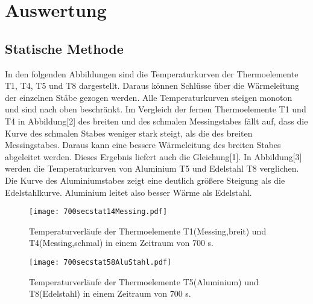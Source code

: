 \section{Auswertung}
\label{sec:Auswertung}
\subsection{Statische Methode}
In den folgenden Abbildungen sind die Temperaturkurven der Thermoelemente T1, T4, T5 und T8 dargestellt.
Daraus können Schlüsse über die Wärmeleitung der einzelnen Stäbe gezogen werden.
Alle Temperaturkurven steigen monoton und sind nach oben beschränkt.
Im Vergleich der fernen Thermoelemente T1 und T4 in Abbildung[2] des breiten und des schmalen Messingstabes fällt auf,
dass die Kurve des schmalen Stabes weniger stark steigt, als die des breiten Messingstabes. Daraus kann eine bessere Wärmeleitung des breiten Stabes 
abgeleitet werden. Dieses Ergebnis liefert auch die Gleichung[1].
In Abbildung[3] werden die Temperaturkurven von Aluminium T5 und Edelstahl T8 verglichen. Die Kurve des Aluminiumstabes zeigt eine deutlich größere Steigung 
als die Edelstahlkurve. Aluminium leitet also besser Wärme als Edelstahl.
\begin{figure}[H]
  \centering
  \texttt{[image: 700secstat14Messing.pdf]}
  \caption{Temperaturverläufe der Thermoelemente T1(Messing,breit) und T4(Messing,schmal) in einem Zeitraum von 700 s.}
  \label{fig:2}
\end{figure}
\begin{figure}[H]
  \centering
  \texttt{[image: 700secstat58AluStahl.pdf]}
  \caption{Temperaturverläufe der Thermoelemente T5(Aluminium) und T8(Edelstahl) in einem Zeitraum von 700 s.}
  \label{fig:3}
\end{figure}

